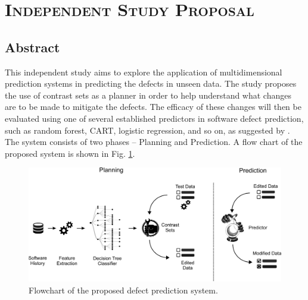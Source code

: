 \documentclass[10pt]{article}
\begin{document}
\section*{\centering \LARGE \textsc{Independent Study Proposal}}

\subsection*{Abstract}
This independent study aims to explore the application of multidimensional 
prediction systems in predicting the defects in unseen data. The study proposes 
the use of contrast sets as a planner in order to help understand what changes 
are to be made to mitigate the defects. The efficacy of these changes will 
then be evaluated using one of several established predictors in software 
defect prediction, such as 
random forest, CART, logistic regression, and so on, as suggested by 
\cite{lessmann}. The 
system 
consists of two 
phases -- Planning and Prediction. A flow chart of the proposed system is shown 
in Fig. \ref{fig1}. 
\begin{figure}[h!]
\centering
\begin{minipage}{0.7\textwidth}
	\centering
	\includegraphics[width = \linewidth]{flowchart}
	\caption{Flowchart of the proposed defect prediction system.}
	\label{fig1}
\end{minipage}
\end{figure}
\end{document}
